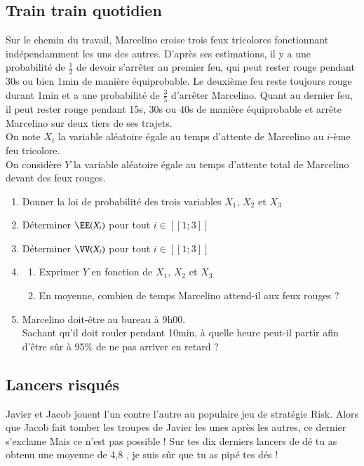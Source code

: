\documentclass[oneside,12pt]{article}          %
\begin{document}
\subsection{Train train quotidien}
Sur le chemin du travail, Marcelino croise trois feux tricolores fonctionnant indépendamment les uns des autres. D'après ses estimations, il y a une probabilité de $\frac{1}{2}$ de devoir s'arrêter au premier feu, qui peut rester rouge pendant 30s ou bien 1min de manière équiprobable. Le deuxième feu reste toujours rouge durant 1min et a une probabilité de $\frac{3}{5}$ d'arrêter Marcelino. Quant au dernier feu, il peut rester rouge pendant 15s, 30s ou 40s de manière équiprobable et arrête Marcelino sur deux tiers de ses trajets.\\[5pt]
On note $X_i$ la variable aléatoire égale au temps d'attente de Marcelino au $i$-ème feu tricolore.\\
On considère $Y$ la variable aléatoire égale au temps d'attente total de Marcelino devant des feux rouges.
\begin{enumerate}
	\item Donner la loi de probabilité des trois variables $X_1$, $X_2$ et $X_3$
    \item Déterminer $\EE(X_i)$ pour tout $i\in[\![1;3]\!]$
    \item Déterminer $\VV(X_i)$ pour tout $i\in[\![1;3]\!]$
    \item \begin{enumerate}
    	\item Exprimer $Y$ en fonction de $X_1$, $X_2$ et $X_3$
    	\item En moyenne, combien de temps Marcelino attend-il aux feux rouges ?
    \end{enumerate}
    \item Marcelino doit-être au bureau à 9h00.\\
    Sachant qu'il doit rouler pendant 10min, à quelle heure peut-il partir afin d'être sûr à 95\% de ne pas arriver en retard ?
\end{enumerate}



\subsection{Lancers risqués}
Javier et Jacob jouent l'un contre l'autre au populaire jeu de stratégie Risk. Alors que Jacob fait tomber les troupes de Javier les unes après les autres, ce dernier s'exclame \og Mais ce n'est pas possible ! Sur tes dix derniers lancers de dé tu as obtenu une moyenne de 4,8 , je suis sûr que tu as pipé tes dés ! \fg
\end{document}
